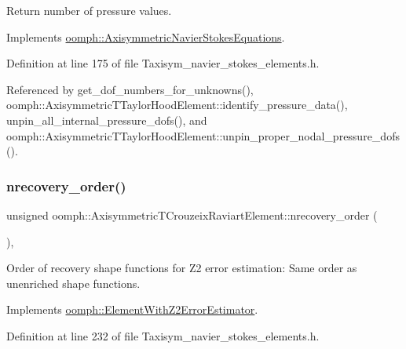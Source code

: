 Return number of pressure values. 



Implements \hyperlink{classoomph_1_1AxisymmetricNavierStokesEquations_a89edaffb4913131cc14a5f6e45ed117a}{oomph\+::\+Axisymmetric\+Navier\+Stokes\+Equations}.



Definition at line 175 of file Taxisym\+\_\+navier\+\_\+stokes\+\_\+elements.\+h.



Referenced by get\+\_\+dof\+\_\+numbers\+\_\+for\+\_\+unknowns(), oomph\+::\+Axisymmetric\+T\+Taylor\+Hood\+Element\+::identify\+\_\+pressure\+\_\+data(), unpin\+\_\+all\+\_\+internal\+\_\+pressure\+\_\+dofs(), and oomph\+::\+Axisymmetric\+T\+Taylor\+Hood\+Element\+::unpin\+\_\+proper\+\_\+nodal\+\_\+pressure\+\_\+dofs().

\mbox{\label{classoomph_1_1AxisymmetricTCrouzeixRaviartElement_a9598ee410d5f554a795fb9b8a701366e}} 
\subsubsection{\texorpdfstring{nrecovery\+\_\+order()}{nrecovery\_order()}}
{\footnotesize\ttfamily unsigned oomph\+::\+Axisymmetric\+T\+Crouzeix\+Raviart\+Element\+::nrecovery\+\_\+order (\begin{DoxyParamCaption}{ }\end{DoxyParamCaption})\hspace{0.3cm}{\ttfamily [inline]}, {\ttfamily [virtual]}}



Order of recovery shape functions for Z2 error estimation\+: Same order as unenriched shape functions. 



Implements \hyperlink{classoomph_1_1ElementWithZ2ErrorEstimator_af39480835bd3e0f6b2f4f7a9a4044798}{oomph\+::\+Element\+With\+Z2\+Error\+Estimator}.



Definition at line 232 of file Taxisym\+\_\+navier\+\_\+stokes\+\_\+elements.\+h.


